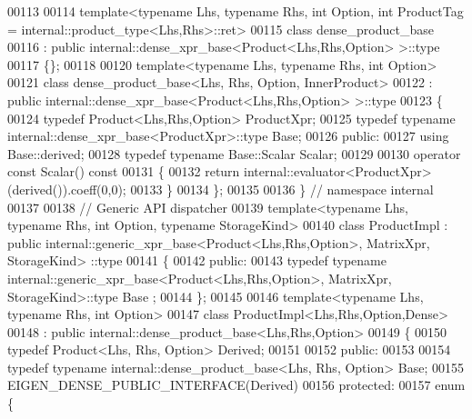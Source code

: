 \begin{DoxyCode}
00113   
00114 template<typename Lhs, typename Rhs, int Option, int ProductTag = internal::product\_type<Lhs,Rhs>::ret>
00115 \textcolor{keyword}{class }dense\_product\_base
00116  : \textcolor{keyword}{public} internal::dense\_xpr\_base<Product<Lhs,Rhs,Option> >::type
00117 \{\};
00118 
00120 \textcolor{keyword}{template}<\textcolor{keyword}{typename} Lhs, \textcolor{keyword}{typename} Rhs, \textcolor{keywordtype}{int} Option>
00121 \textcolor{keyword}{class }dense\_product\_base<Lhs, Rhs, Option, InnerProduct>
00122  : \textcolor{keyword}{public} internal::dense\_xpr\_base<Product<Lhs,Rhs,Option> >::type
00123 \{
00124   \textcolor{keyword}{typedef} Product<Lhs,Rhs,Option> ProductXpr;
00125   \textcolor{keyword}{typedef} \textcolor{keyword}{typename} internal::dense\_xpr\_base<ProductXpr>::type Base;
00126 \textcolor{keyword}{public}:
00127   \textcolor{keyword}{using} Base::derived;
00128   \textcolor{keyword}{typedef} \textcolor{keyword}{typename} Base::Scalar Scalar;
00129   
00130   \textcolor{keyword}{operator} \textcolor{keyword}{const} Scalar()\textcolor{keyword}{ const}
00131 \textcolor{keyword}{  }\{
00132     \textcolor{keywordflow}{return} internal::evaluator<ProductXpr>(derived()).coeff(0,0);
00133   \}
00134 \};
00135 
00136 \} \textcolor{comment}{// namespace internal}
00137 
00138 \textcolor{comment}{// Generic API dispatcher}
00139 \textcolor{keyword}{template}<\textcolor{keyword}{typename} Lhs, \textcolor{keyword}{typename} Rhs, \textcolor{keywordtype}{int} Option, \textcolor{keyword}{typename} StorageKind>
00140 \textcolor{keyword}{class }ProductImpl : \textcolor{keyword}{public} internal::generic\_xpr\_base<Product<Lhs,Rhs,Option>, MatrixXpr, StorageKind>
      ::type
00141 \{
00142   \textcolor{keyword}{public}:
00143     \textcolor{keyword}{typedef} \textcolor{keyword}{typename} internal::generic\_xpr\_base<Product<Lhs,Rhs,Option>, MatrixXpr, StorageKind>::type Base
      ;
00144 \};
00145 
00146 \textcolor{keyword}{template}<\textcolor{keyword}{typename} Lhs, \textcolor{keyword}{typename} Rhs, \textcolor{keywordtype}{int} Option>
00147 \textcolor{keyword}{class }ProductImpl<Lhs,Rhs,Option,Dense>
00148   : \textcolor{keyword}{public} internal::dense\_product\_base<Lhs,Rhs,Option>
00149 \{
00150     \textcolor{keyword}{typedef} Product<Lhs, Rhs, Option> Derived;
00151     
00152   \textcolor{keyword}{public}:
00153     
00154     \textcolor{keyword}{typedef} \textcolor{keyword}{typename} internal::dense\_product\_base<Lhs, Rhs, Option> Base;
00155     EIGEN\_DENSE\_PUBLIC\_INTERFACE(Derived)
00156   \textcolor{keyword}{protected}:
00157     \textcolor{keyword}{enum} \{

\end{DoxyCode}
